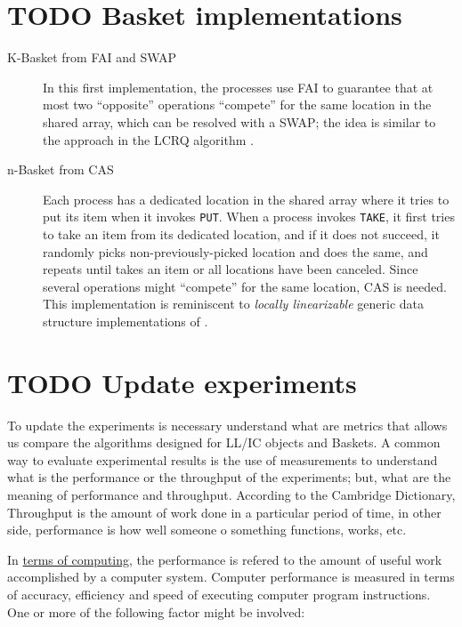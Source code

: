 \documentclass[openany, a4paper]{book}
\theoremstyle{break}
\theoremstyle{example}
\theoremstyle{note}
\theoremstyle{break}
\theoremstyle{exercise}
\begin{document}
\section{{\bfseries\sffamily TODO} Basket implementations}
\label{sec:org402ce24}

\begin{description}
\item[{K-Basket from FAI and SWAP}] In this first implementation, the processes
use FAI to guarantee that at most two ``opposite'' operations ``compete''
for the same location in the shared array, which can be resolved with a
SWAP; the idea is similar to the approach in the LCRQ algorithm
\cite{ppopp2013x86queues}.
\item[{n-Basket from CAS}] Each process has a dedicated location in the shared
array where it tries to put its item when it invokes \texttt{PUT}. When a process
invokes \texttt{TAKE}, it first tries to take an item from its dedicated location,
and if it does not succeed, it randomly picks non-previously-picked
location and does the same, and repeats until takes an item or all
locations have been canceled. Since several operations might ``compete''
for the same location, CAS is needed. This implementation is reminiscent
to \emph{locally linearizable} generic data structure implementations of
\cite{DBLP_conf_concur_HaasHHKLPSSV16}.
\end{description}

\section{{\bfseries\sffamily TODO} Update experiments}
\label{sec:org9ffec70}

To update the experiments is necessary understand what are metrics that
allows us compare the algorithms designed for LL/IC objects and
Baskets. A common way to evaluate experimental results is the use of
measurements to understand what is the performance or the throughput of the
experiments; but, what are the meaning of performance and
throughput. According to the Cambridge Dictionary,
Throughput is the amount of work done in a particular period of time,
in other side, performance is how well someone o something functions, works,
etc.

In \href{https://en.wikipedia.org/wiki/Computer\_performance}{terms of computing}, the performance is refered to the amount of
useful work accomplished by a computer system. Computer performance is
measured in terms of accuracy, efficiency and speed of executing computer
program instructions. One or more of the following factor might be involved:
\end{document}
